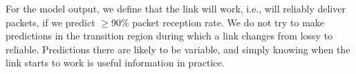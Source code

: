 For the model output, we define that the link will work, i.e., will reliably deliver packets, if we predict $\geq$90\% packet reception rate. We do not try to make predictions in the transition region during which a link changes from lossy to reliable. Predictions there are likely to be variable, and simply knowing when the link starts to work is useful information in practice.

\ifx\mainfile\undefined

\fi